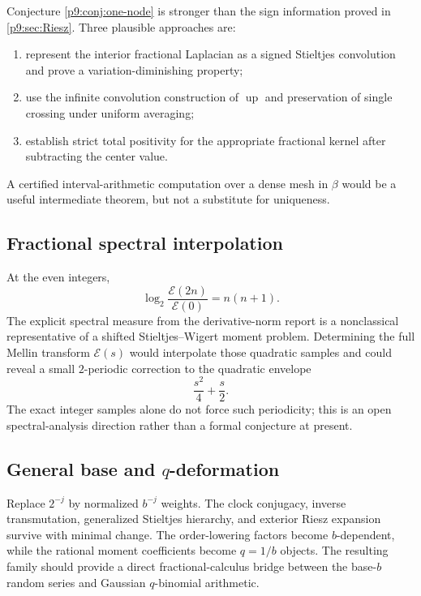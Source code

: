 \documentclass[11pt,oneside]{article}
\theoremstyle{definition}
\theoremstyle{remark}
\newcommand{\Up}{\operatorname{up}}
\newcommand{\1}{\mathbf 1}
\begin{document}
Conjecture \ref{p9:conj:one-node} is stronger than the sign information proved in
\cref{p9:sec:Riesz}.  Three plausible approaches are:
\begin{enumerate}
\item represent the interior fractional Laplacian as a signed Stieltjes
      convolution and prove a variation-diminishing property;
\item use the infinite convolution construction of $\Up$ and preservation of
      single crossing under uniform averaging;
\item establish strict total positivity for the appropriate fractional kernel
      after subtracting the center value.
\end{enumerate}
A certified interval-arithmetic computation over a dense mesh in $\beta$ would
be a useful intermediate theorem, but not a substitute for uniqueness.

\subsection{Fractional spectral interpolation}

At the even integers,
\begin{equation}
 \log_2\frac{\mathcal E(2n)}{\mathcal E(0)}=n(n+1).
 \label{p9:eq:E-quadratic-samples}
\end{equation}
The explicit spectral measure from the derivative-norm report is a
nonclassical representative of a shifted Stieltjes--Wigert moment problem.
Determining the full Mellin transform $\mathcal E(s)$ would interpolate those
quadratic samples and could reveal a small $2$-periodic correction to the
quadratic envelope
\begin{equation}
 \frac{s^2}{4}+\frac{s}{2}.
 \label{p9:eq:E-quadratic-envelope}
\end{equation}
The exact integer samples alone do not force such periodicity; this is an
open spectral-analysis direction rather than a formal conjecture at present.

\subsection{General base and \texorpdfstring{$q$}{q}-deformation}

Replace $2^{-j}$ by normalized $b^{-j}$ weights.  The clock conjugacy,
inverse transmutation, generalized Stieltjes hierarchy, and exterior Riesz
expansion survive with minimal change.  The order-lowering factors become
$b$-dependent, while the rational moment coefficients become $q=1/b$
objects.  The resulting family should provide a direct fractional-calculus
bridge between the base-$b$ random series and Gaussian $q$-binomial
arithmetic.
\end{document}
